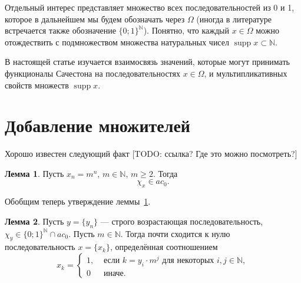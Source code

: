 \documentclass[a4paper,openbib]{article}
\renewcommand{\geq}{\geqslant} %
\DeclareMathOperator{\supp}{supp}
\theoremstyle{definition}
\newtheorem{lemma}{Лемма}[section]
\begin{document}
Отдельный интерес представляет множество всех последовательностей из 0 и 1,
которое в дальнейшем мы будем обозначать через $\Omega$
(иногда в литературе~\cite{Semenov2014geomprops} встречается также обозначение $\{0;1\}^\mathbb{N}$).
Понятно, что каждый $x\in \Omega$ можно отождествить с подмножеством множества натуральных чисел
$\supp x \subset \mathbb{N}$.

В настоящей статье изучается взаимосвязь значений, которые могут принимать функционалы Сачестона
на последовательностях $x\in \Omega$, и мультипликативных свойств множеств $\supp x$.





\section{Добавление множителей}

Хорошо известен следующий факт
[TODO: ссылка? Где это можно посмотреть?]

\begin{lemma}
	\label{lem:simple_powers_in_ac0}
	Пусть $x_n = m^n$, $m\in\mathbb{N}$, $m\geq 2$.
	Тогда 
	\begin{equation}
		\chi_x \in ac_0
		.
	\end{equation} 
\end{lemma}

Обобщим теперь утверждение леммы~\ref{lem:simple_powers_in_ac0}.

\begin{lemma}
	Пусть $y = \{y_n\}$ --- строго возрастающая последовательность,
	$\chi_y\in\{0;1\}^\mathbb{N} \cap ac_0$.
	Пусть $m \in \mathbb{N}$.
	Тогда почти сходится к нулю последовательность $x=\{x_k\}$, определённая соотношением
	\begin{equation}
		x_k = \begin{cases}
			1, &\mbox{~если~} k = y_i \cdot m^j \mbox{~для некоторых~} i,j\in\mathbb{N},
			\\
			0  &\mbox{~иначе}
			.
		\end{cases}
	\end{equation}
\end{lemma}
\end{document}
